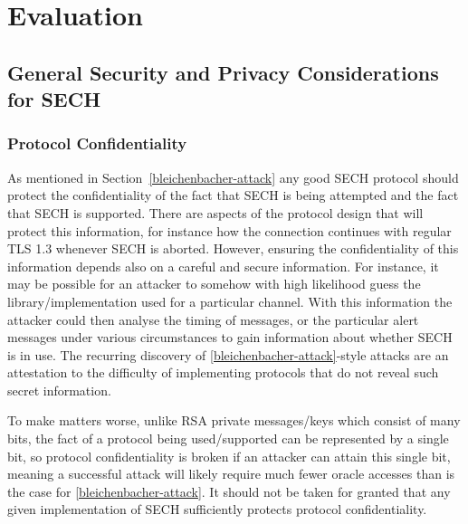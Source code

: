 \chapter{Evaluation}
\label{chap:Evaluation}

\section{General Security and Privacy Considerations for SECH}

\subsection{Protocol Confidentiality}
As mentioned in Section~\ref{bleichenbacher-attack} any good \ac{SECH} protocol should protect the confidentiality of the fact that \ac{SECH} is being attempted and the fact that \ac{SECH} is supported. There are aspects of the protocol design that will protect this information, for instance how the connection continues with regular \ac{TLS} 1.3 whenever \ac{SECH} is aborted.
However, ensuring the confidentiality of this information depends also on
a careful and secure information. For instance, it may be possible for an attacker to somehow with high likelihood guess the library/implementation used for a particular channel. With this information the attacker could then analyse the timing of messages, or the particular alert messages under various circumstances to gain information about whether \ac{SECH} is in use.
The recurring discovery of \ref{bleichenbacher-attack}-style attacks are an attestation to the difficulty of implementing protocols that do not reveal such secret information.

To make matters worse, unlike \ac{RSA} private messages/keys which consist of many bits, the fact of a protocol being used/supported can be represented by a single bit, so protocol confidentiality is broken if an attacker can attain this single bit, meaning a successful attack will likely require much fewer oracle accesses than is the case for \ref{bleichenbacher-attack}. It should not be taken for granted that any given implementation of \ac{SECH} sufficiently protects protocol confidentiality.


